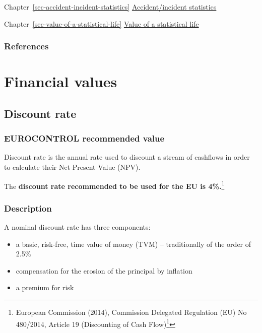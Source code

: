 \documentclass[
  11pt,
  a4paper,
]{book}
\DeclareRobustCommand{\href}[2]{#2\footnote{\url{#1}}}
\begin{document}
Chapter~\ref{sec-accident-incident-statistics}
\protect\hyperlink{sec-accident-incident-statistics}{Accident/incident
statistics}

Chapter~\ref{sec-value-of-a-statistical-life}
\protect\hyperlink{sec-value-of-a-statistical-life}{Value of a
statistical life}

\hypertarget{references-39}{%
\section{References}\label{references-39}}

\part{Financial values}

\hypertarget{sec-discount-rate}{%
\chapter{Discount rate}\label{sec-discount-rate}}

\hypertarget{eurocontrol-recommended-value-2}{%
\section{EUROCONTROL recommended
value}\label{eurocontrol-recommended-value-2}}

Discount rate is the annual rate used to discount a stream of cashflows
in order to calculate their Net Present Value (NPV).

The \textbf{discount rate recommended to be used for the EU is
4\%.}\footnote{\href{https://eur-lex.europa.eu/legal-content/EN/TXT/?uri=uriserv\%3AOJ.L_.2014.138.01.0005.01.ENG}{European
  Commission (2014), Commission Delegated Regulation (EU) No 480/2014,
  Article 19 (Discounting of Cash Flow)}}

\hypertarget{description-16}{%
\section{Description}\label{description-16}}

A nominal discount rate has three components:

\begin{itemize}
\item
  a basic, risk-free, time value of money (TVM) -- traditionally of the
  order of 2.5\%
\item
  compensation for the erosion of the principal by inflation
\item
  a premium for risk
\end{itemize}
\end{document}
